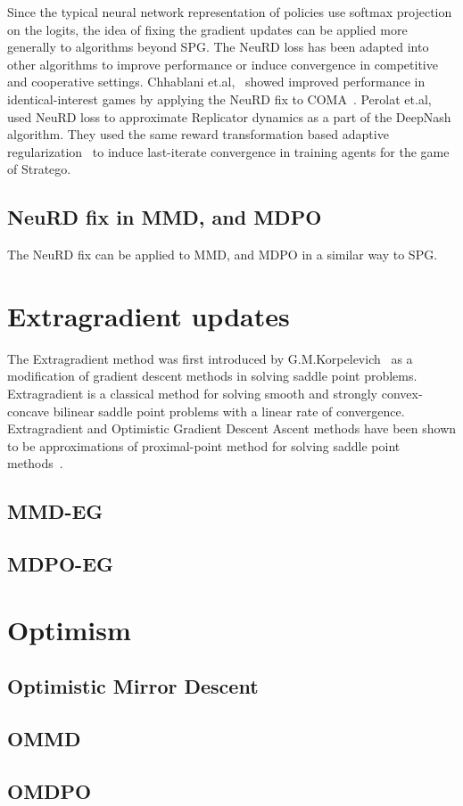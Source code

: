 Since the typical neural network representation of policies use softmax projection on the logits,
the idea of fixing the gradient updates can be applied more generally to algorithms beyond SPG.
The NeuRD loss has been adapted into other algorithms to improve performance or induce convergence
in competitive and cooperative settings.
Chhablani et.al,~\cite{chhablaniCounterfactual2021} showed improved performance in
identical-interest games by applying the NeuRD fix to COMA~\cite{foersterCounterfactual2018}.
Perolat et.al,~\cite{perolatMastering2022} used NeuRD loss to approximate Replicator dynamics 
as a part of the DeepNash algorithm. 
They used the same reward transformation based adaptive regularization~\cite{perolatPoincare2021} to induce last-iterate convergence in training agents for the game of Stratego.

\subsection{NeuRD fix in MMD, and MDPO}
The NeuRD fix can be applied to MMD, and MDPO in a similar way to SPG.


\section{Extragradient updates}

The Extragradient method was first introduced by
G.M.Korpelevich~\cite{korpelevichextragradient1976} as a modification of gradient descent methods
in solving saddle point problems.
Extragradient is a classical method for solving smooth and strongly convex-concave bilinear saddle
point problems with a linear rate of convergence.
Extragradient and Optimistic Gradient Descent Ascent methods have been shown to be approximations
of proximal-point method for solving saddle point methods~\cite{mokhtariUnified2020}.

\subsection{MMD-EG}

\subsection{MDPO-EG}

\section{Optimism}


\subsection{Optimistic Mirror Descent}

\subsection{OMMD}
\subsection{OMDPO}

